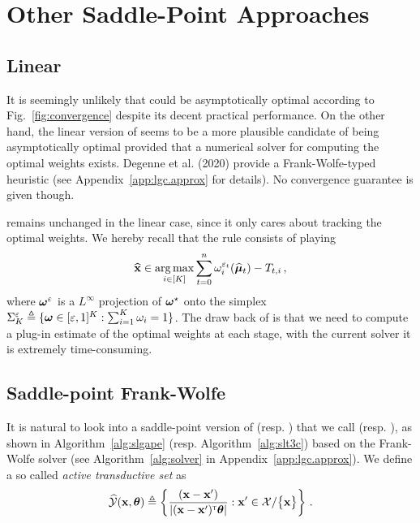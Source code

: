 \section{Other Saddle-Point Approaches}\label{sec:lgc.sp}

\subsection{Linear \texorpdfstring{\Track{}}{}}

It is seemingly unlikely that \LTCCG{} could be asymptotically optimal according to Fig.~\ref{fig:convergence} despite its decent practical performance. On the other hand, the linear version of \Track seems to be a more plausible candidate of being asymptotically optimal provided that a numerical solver for computing the optimal weights exists. Degenne et al. (2020) provide a Frank-Wolfe-typed heuristic (see Appendix~\ref{app:lgc.approx} for details). No convergence guarantee is given though.

\Track remains unchanged in the linear case, since it only cares about tracking the optimal weights. We hereby recall that the \CT rule consists of playing
\[
    \widehat{{\bf x}} \in \operatorname*{arg\,max}_{i\in[K]} \sum_{t=0}^n \omega_i^{\varepsilon_t}(\widehat{{\boldsymbol \mu}}_t)-T_{t,i}\,,
\]
where ${\boldsymbol \omega}^\varepsilon$ is a $L^\infty$ projection of ${\boldsymbol \omega}^\star$ onto the simplex $\Sigma_K^\varepsilon \triangleq \{{\boldsymbol \omega}\in [\varepsilon,1]^K : \sum_{i=1}^K \omega_i = 1\}$. The draw back of \Track is that we need to compute a plug-in estimate of the optimal weights at each stage, with the current solver it is extremely time-consuming.

\subsection{Saddle-point Frank-Wolfe}
It is natural to look into a saddle-point version of \LGapE (resp. \LTCC) that we call \SLGapE (resp. \SLTCC), as shown in Algorithm~\ref{alg:slgape} (resp. Algorithm~\ref{alg:slt3c}) based on the Frank-Wolfe solver (see Algorithm~\ref{alg:solver} in Appendix~\ref{app:lgc.approx}). We define a so called \emph{active transductive set} as
\begin{align}\label{def:active_transductive}
    \widehat{\mathcal{Y}}({\bf x},{\boldsymbol \theta}) \triangleq \left\{ \frac{({\bf x}- {\bf x}')}{\left|({\bf x}-{\bf x}')^\mathsf{\scriptscriptstyle T}{\boldsymbol \theta}\right|}: {\bf x}'\in\mathcal{X}/\big\{{\bf x}\big\}  \right\}\,.
\end{align}

